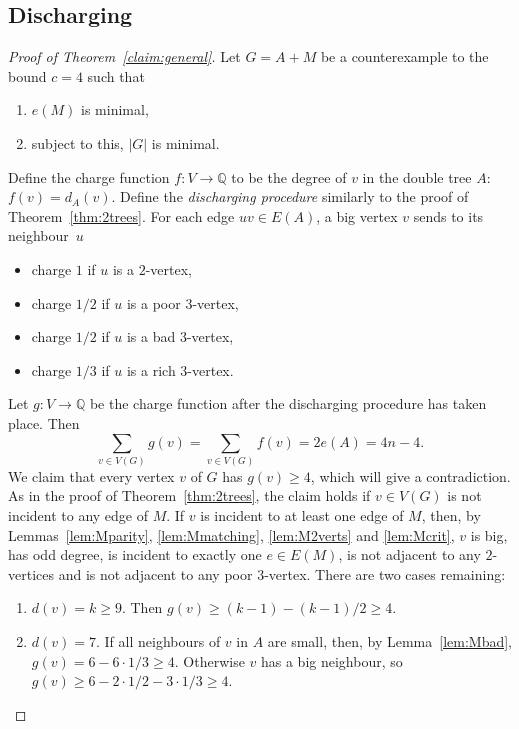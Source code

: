 \documentclass[11pt, reqno, a4paper]{article}
\theoremstyle{definition}
\numberwithin{equation}{section}
\newcommand{\Q}{\mathbb{Q}}
\renewcommand{\geq}{\geqslant}
\begin{document}
\subsection{Discharging}
\begin{proof}[Proof of Theorem~\ref{claim:general}]
Let $G = A + M$ be a counterexample to the bound $c = 4$ such that
\begin{enumerate}[noitemsep]
\item $e(M)$ is minimal,
\item subject to this, $|G|$ is minimal.
\end{enumerate}

Define the charge function $f\colon V \to \Q$ to be the degree of $v$ in the double tree $A$: $f(v) = d_A(v)$. 
Define the \emph{discharging procedure} similarly to the proof of Theorem~\ref{thm:2trees}. 
For each edge $uv \in E(A)$, a big vertex $v$ sends to its \mbox{neighbour $u$}
\begin{itemize}[noitemsep]
\item charge $1$ if $u$ is a $2$-vertex,
\item charge $1/2$ if $u$ is a poor $3$-vertex, 
\item charge $1/2$ if $u$ is a bad $3$-vertex, 
\item charge $1/3$ if $u$ is a rich $3$-vertex.
\end{itemize}
Let $g\colon V\to \Q$ be the charge function after the discharging procedure has taken place.
Then 
\begin{equation*}
\sum_{v\in V(G)} g(v) = \sum_{v\in V(G)} f(v) = 2e(A) = 4 n -  4.
\end{equation*}
We claim that every vertex $v$ of $G$ has $g(v) \geq 4$, which will give a contradiction.
As in the proof of Theorem~\ref{thm:2trees}, the claim holds if $v\in V(G)$ is not incident to any edge of $M$.
If $v$ is incident to at least one edge of $M$, then, by Lemmas~\ref{lem:Mparity}, \ref{lem:Mmatching}, \ref{lem:M2verts} and \ref{lem:Mcrit}, $v$ is big, has odd degree, is incident to exactly one $e\in E(M)$, is not adjacent to any $2$-vertices and is not adjacent to any poor $3$-vertex. There are two cases remaining:
\begin{enumerate}
\item $d(v) = k\geq 9$.
Then $g(v) \geq (k - 1) - (k-1)/2\geq 4$.
\item $d(v) = 7$.
If all neighbours of $v$ in $A$ are small, then, by Lemma~\ref{lem:Mbad}, $g(v) = 6 - 6\cdot 1/3\geq 4$.
Otherwise $v$ has a big neighbour, so $g(v) \geq 6 - 2\cdot 1/2 -  3\cdot 1/3\geq 4$.\qedhere
\end{enumerate}
\end{proof}
\end{document}
